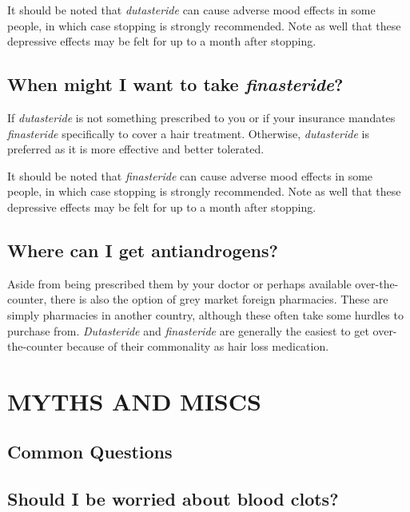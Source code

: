 \documentclass{article}
\begin{document}
{{It should be noted that \textit{dutasteride} can cause adverse mood effects in some people, in which case stopping is strongly recommended. Note as well that these depressive effects may be felt for up to a month after stopping. 

\subsection{When might I want to take \textit{finasteride}?}

If \textit{dutasteride }is not something prescribed to you or if your insurance mandates \textit{finasteride} specifically to cover a hair treatment. Otherwise, \textit{dutasteride} is preferred as it is more effective and better tolerated.

It should be noted that \textit{finasteride} can cause adverse mood effects in some people, in which case stopping is strongly recommended. Note as well that these depressive effects may be felt for up to a month after stopping.

\subsection{Where can I get antiandrogens?}

Aside from being prescribed them by your doctor or perhaps available over-the-counter, there is also the option of grey market foreign pharmacies. These are simply pharmacies in another country, although these often take some hurdles to purchase from. \textit{Dutasteride} and \textit{finasteride }are generally the easiest to get over-the-counter because of their commonality as hair loss medication.

 

\section{MYTHS AND MISCS}\label{MM}

\subsection*{Common Questions}

\subsection{Should I be worried about blood clots?}\label{11-1}

}}
\end{document}
